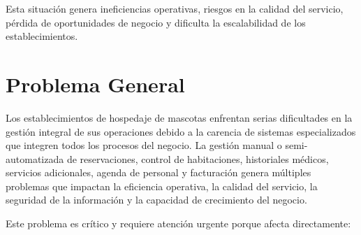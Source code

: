 	Esta situación genera ineficiencias operativas, riesgos en la calidad del servicio, pérdida de oportunidades de negocio y dificulta la escalabilidad de los establecimientos.

\section{Problema General}
\label{sec:problemaGeneral}

	Los establecimientos de hospedaje de mascotas enfrentan serias dificultades en la gestión integral de sus operaciones debido a la carencia de sistemas especializados que integren todos los procesos del negocio. La gestión manual o semi-automatizada de reservaciones, control de habitaciones, historiales médicos, servicios adicionales, agenda de personal y facturación genera múltiples problemas que impactan la eficiencia operativa, la calidad del servicio, la seguridad de la información y la capacidad de crecimiento del negocio.
	
	Este problema es crítico y requiere atención urgente porque afecta directamente:
	
